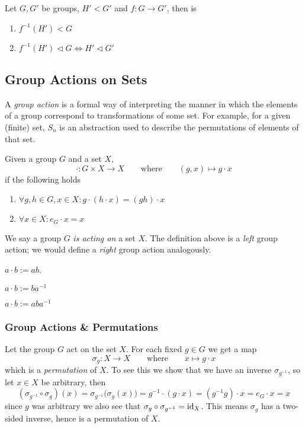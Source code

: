 \begin{proposition}
   Let \(G, G'\) be groups, \(H' < G'\) and \(f: G \to G'\), then is
   \begin{enumerate}[label=\roman*, align=Center]
      \item \(f^{-1}(H') < G\)
      \item \(f^{-1}(H') \triangleleft G \iff H' \triangleleft G'\)
   \end{enumerate}
\end{proposition}

\subsection{Group Actions on Sets}
A \emph{group action} is a formal way of interpreting the manner in which the elements of a group correspond to transformations of some set.
For example, for a given (finite) set, \(S_n\) is an abstraction used to describe the permutations of elements of that set.

\begin{definition}
   Given a group \(G\) and a set \(X\),
   \[\cdot: G \times X \to X \qquad\text{where}\qquad (g, x) \mapsto g \cdot x\]
   if the following holds
   \begin{enumerate}[label=\roman*, align=Center]
      \item \(\forall g, h \in G, x \in X: g \cdot (h \cdot x) = (gh) \cdot x\)
      \item \(\forall x \in X: e_G \cdot x = x\)
   \end{enumerate}
\end{definition}
\begin{remark}[Terminology]
   We say a group \(G\) \emph{is acting on} a set \(X\).
   The definition above is a \emph{left} group action; we would define a \emph{right} group action analogously.
\end{remark}
\begin{example}
   \(a \cdot b := ab\).
\end{example}
\begin{example}
   \(a \cdot b := ba^{-1}\)
\end{example}
\begin{example}[Conjugation]
   \(a \cdot b := aba^{-1}\)
\end{example}

\subsubsection{Group Actions \& Permutations}
Let the group \(G\) act on the set \(X\).
For each fixed \(g \in G\) we get a map
\[\sigma_g: X \to X \qquad\text{where}\qquad x \mapsto g \cdot x\]
which is a \emph{permutation} of \(X\).
To see this we show that we have an inverse \(\sigma_{g^{-1}}\), so let \(x \in X\) be arbitrary, then
\[(\sigma_{g^{-1}} \circ \sigma_g)(x) = \sigma_{g^{-1}}\big(\sigma_g(x)\big) = g^{-1} \cdot (g \cdot x) = (g^{-1}g) \cdot x = e_G \cdot x = x\]
since \(g\) was arbitrary we also see that \(\sigma_g \circ \sigma_{g^{-1}} = \operatorname{id}_X\).
This means \(\sigma_g\) has a two-sided inverse, hence is a permutation of \(X\).

